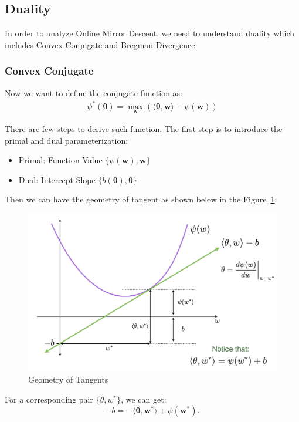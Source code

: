 \documentclass[11pt]{article}
\DeclareMathOperator*{\maximize}{max}
\newcommand{\btheta}{\boldsymbol{\theta}}
\newcommand{\bw}{\boldsymbol{w}}
\begin{document}
\subsection{Duality}

In order to analyze Online Mirror Descent, we need to understand duality which includes Convex Conjugate and Bregman Divergence.

\subsubsection{Convex Conjugate}
Now we want to define the conjugate function as:
\begin{align}
\psi^* (\btheta) = \maximize_{\bw} \left( \langle \btheta, \bw\rangle - \psi (\bw) \right) \nonumber
\end{align}

There are few steps to derive such function. The first step is to introduce the primal and dual parameterization:

\begin{itemize}
    \item Primal: Function-Value $\{\psi (\bw), \bw\}$
    \item Dual: Intercept-Slope $\{b (\btheta), 
    \btheta\}$
\end{itemize}
Then we can have the geometry of tangent as shown below in the Figure~\ref{fig:tangent}:

\begin{figure}[H]
\begin{center}
\includegraphics[width=0.7\linewidth]{Img/geometry_tangent.png}
\end{center}
\vspace{-10mm}
 \caption{Geometry of Tangents}
\label{fig:tangent}
\end{figure}
For a corresponding pair $\{ \theta, w^*\}$, we can get:
$$-b = - \langle \btheta, \bw^* \rangle + \psi (\bw^*).$$
\end{document}
